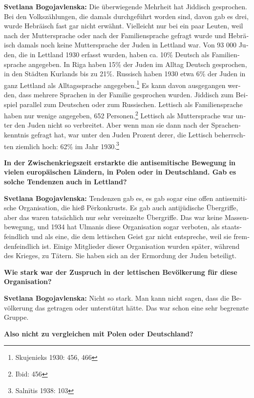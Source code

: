 \begin{otherlanguage}{ngerman}
\textbf{Svetlana Bogojavlenska:} Die überwiegende Mehrheit hat Jiddisch gesprochen. Bei den Volkszählungen, die damals durchgeführt worden sind, davon gab es drei, wurde Hebräisch fast gar nicht erwähnt. Vielleicht nur bei ein paar Leuten, weil nach der Muttersprache oder nach der Familiensprache gefragt wurde und Hebräisch damals noch keine Muttersprache der Juden in Lettland war.
Von 93 000 Juden, die in Lettland 1930 erfasst wurden, haben ca. 10\% Deutsch als Familiensprache angegeben. In Riga haben 15\% der Juden im Alltag Deutsch gesprochen, in den Städten Kurlands bis zu 21\%. Russisch haben 1930 etwa 6\% der Juden in ganz Lettland als Alltagssprache angegeben.\footnote{Skujenieks 1930: 456, 466}  Es kann davon ausgegangen werden, dass mehrere Sprachen in der Familie gesprochen wurden. Jiddisch zum Beispiel parallel zum Deutschen oder zum Russischen. 
Lettisch als Familiensprache haben nur wenige angegeben, 652 Personen.\footnote{Ibid: 456}  Lettisch als Muttersprache war unter den Juden nicht so verbreitet. Aber wenn man sie dann nach der Sprachenkenntnis gefragt hat, war unter den Juden Prozent derer, die Lettisch beherrschten ziemlich hoch: 62\% im Jahr 1930.\footnote{Salnītis 1938: 103}

\textbf{In der Zwischenkriegszeit erstarkte die antisemitische Bewegung in vielen europäischen Ländern, in Polen oder in Deutschland. Gab es solche Tendenzen auch in Lettland?}

\textbf{Svetlana Bogojavlenska:} Tendenzen gab es, es gab sogar eine offen antisemitische Organisation, die hieß Pērkonkrusts. Es gab auch antijüdische Übergriffe, aber das waren tatsächlich nur sehr vereinzelte Übergriffe. Das war keine Massenbewegung, und 1934 hat Ulmanis diese Organisation sogar verboten, als staatsfeindlich und als eine, die dem lettischen Geist gar nicht entspreche, weil sie fremdenfeindlich ist. Einige Mitglieder dieser Organisation wurden später, während des Krieges, zu Tätern. Sie haben sich an der Ermordung der Juden beteiligt.

\textbf{Wie stark war der Zuspruch in der lettischen Bevölkerung für diese Organisation?}

\textbf{Svetlana Bogojavlenska:} Nicht so stark. Man kann nicht sagen, dass die Bevölkerung das getragen oder unterstützt hätte. Das war schon eine sehr begrenzte Gruppe.
 
\textbf{Also nicht zu vergleichen mit Polen oder Deutschland?}


\end{otherlanguage}
